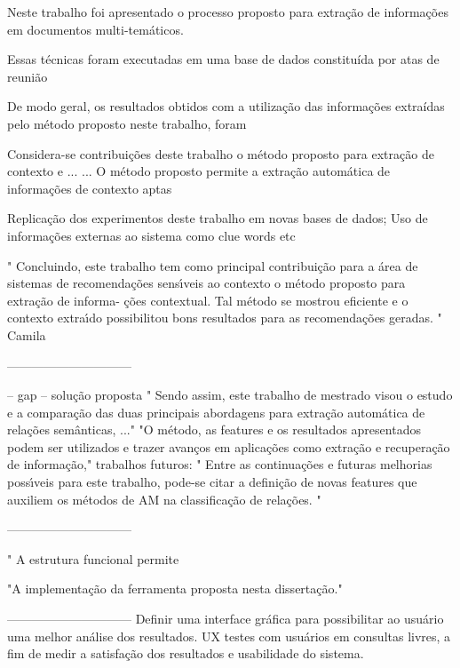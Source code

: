 






Neste trabalho foi apresentado o processo proposto para extração de informações em documentos multi-temáticos.


Essas técnicas foram executadas em uma base de dados constituída por atas de reunião



De modo geral, os resultados obtidos com a utilização das informações extraídas pelo método
proposto neste trabalho, foram 



Considera-se contribuições deste trabalho o método proposto para extração de contexto e
...
...
O método proposto permite a extração automática de informações de contexto aptas


 Replicação dos experimentos deste trabalho em novas bases de dados;
 Uso de informações externas ao sistema como clue words etc




" Concluindo, este trabalho tem como principal contribuição para a área de sistemas de recomendações sensı́veis ao contexto o método proposto para extração de informa- ções contextual. Tal método se mostrou eficiente e o contexto extraı́do possibilitou bons resultados para as recomendações geradas. "
Camila


------------------------------

-- gap
-- solução proposta
	" Sendo assim, este trabalho de mestrado visou o estudo e a comparação das duas principais abordagens para extração automática de relações semânticas, ..."
	"O método, as features e os resultados apresentados podem ser utilizados e trazer avanços em aplicações como extração e recuperação de informação,"
trabalhos futuros:
	" Entre as continuações e futuras melhorias possı́veis para este trabalho, pode-se citar a definição de novas features que auxiliem os métodos de AM na classificação de relações. "




------------------------------



" A estrutura funcional permite

"A implementação da ferramenta proposta nesta dissertação."



------------------------------
Definir uma interface gráfica para possibilitar ao usuário
uma melhor análise dos resultados. {UX} testes com usuários em consultas livres, a fim de medir a satisfação dos resultados e usabilidade do sistema.


